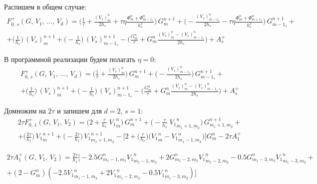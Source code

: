Распишем в общем случае:
\begin{multline*}
F_{0, \, s}^+ (G, \, V_1, \, \ldots, \, V_d) = 
\bigg( \frac{1}{\tau} + \frac{(V_s)^n_m}{2 h_s} + \tau \eta \frac{\Phi^n_m + \Phi^n_{m - 1_s}}{h_s^2} \bigg) \, G^{n+1}_m
+
\bigg( - \frac{(V_s)^n_{m - 1_s}}{2 h_s} - \tau \eta \frac{\Phi^n_m + \Phi^n_{m + 1_s}}{h_s^2} \bigg) \, G^{n+1}_{m - 1_s}
+ \\ +
\bigg( \frac{1}{h_s} \bigg) \, (V_s)^{n+1}_m
+
\bigg( - \frac{1}{h_s} \bigg) \, (V_s)^{n+1}_{m - 1_s}
-
\bigg( \frac{G^n_m}{\tau} + G^n_m \frac{(V_s)^n_m - (V_s)^n_{m - 1_s}}{2 h_s} \bigg) + A_{s}^+
\end{multline*}

В программной реализации будем полагать $\eta = 0$:
\begin{multline*}
F_{0, \, s}^+ (G, \, V_1, \, \ldots, \, V_d) = 
\bigg( \frac{1}{\tau} + \frac{(V_s)^n_m}{2 h_s} \bigg) \, G^{n+1}_m
+
\bigg( - \frac{(V_s)^n_{m - 1_s}}{2 h_s} \bigg) \, G^{n+1}_{m - 1_s}
+ \\ +
\bigg(   \frac{1}{h_s} \bigg) \, (V_s)^{n+1}_m
+
\bigg( - \frac{1}{h_s} \bigg) \, (V_s)^{n+1}_{m - 1_s}
-
\bigg( \frac{G^n_m}{\tau} + G^n_m \frac{(V_s)^n_m - (V_s)^n_{m - 1_s}}{2 h_s} \bigg) + A_{s}^+
\end{multline*}

Домножим на $2\tau$ и запишем для $d=2$, $s=1$:
\begin{multline*}
2\tau F_{0, \, 1}^+ (G, \, V_1, \, V_2) = 
\bigg( 2 + \frac{\tau}{h_1} \; {V_1}^n_m \bigg) \, G^{n+1}_m
+ \bigg( - \frac{\tau}{h_1} \; {V_1}^n_{m_1 + 1, m_2} \bigg) \, G^{n+1}_{m_1 + 1, m_2}
+ \\ +
  \bigg(   \frac{2\tau}{h_1} \bigg) \, {V_1}^{n+1}_m
+ \bigg( - \frac{2\tau}{h_1} \bigg) \, {V_1}^{n+1}_{m_1 + 1, m_2}
- \bigg[ 2  
   + \bigg( \frac{\tau}{h_1} \bigg) \bigg( {V_1}^n_m - {V_1}^n_{m_1 - 1, m_2}\bigg)
  \bigg] G^n_m - 2\tau A_{1}^+
\end{multline*}

\begin{multline*}
2\tau A_{1}^+ (G, \, V_1, \, V_2) = \frac{2\tau}{h_1}
\bigg[ - 2.5 G^{n}_{m_1 - 1, m_2} {V_1}^{n}_{m_1 - 1, m_2} 
       + 2   G^{n}_{m_1 - 2, m_2} {V_1}^{n}_{m_1 - 2, m_2} 
       - 0.5 G^{n}_{m_1 - 3, m_2} {V_1}^{n}_{m_1 - 3, m_2} 
+ \\ + (2 - G^{n}_{m}) (
   	   - 2.5 {V_1}^{n}_{m_1 - 1, m_2} 
       + 2   {V_1}^{n}_{m_1 - 2, m_2} 
       - 0.5 {V_1}^{n}_{m_1 - 3, m_2} 
) \bigg]
\end{multline*}

